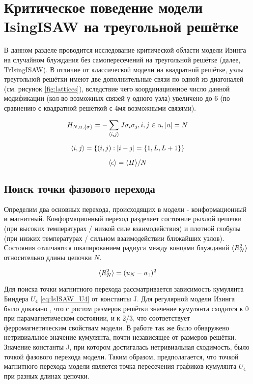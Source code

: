 \section{Критическое поведение модели IsingISAW на треугольной решётке}

В данном разделе проводится исследование критической области модели Изинга на случайном блуждания без самопересечений на треугольной решётке (далее, TrIsingISAW).
В отличие от классической модели на квадратной решётке, узлы треугольной решётки имеют две дополнительные связи по одной из диагоналей (см. рисунок \ref{fig:lattices}), 
вследствие чего координационное число данной модификации (кол-во возможных связей у одного узла) увеличено до 6 (по сравнению с квадратной решёткой с 4мя возможными связями).

\begin{equation}
\label{eq:IsISAW_H}
 H_{N,u,\{\sigma\}} = -\sum_{\langle i,j \rangle} J\sigma_i \sigma_j, i,j \in u, |u| = N
\end{equation}

\begin{equation}
	\langle i,j \rangle = \{(i,j): |i-j| = \{1, L, L+1\} \}
\end{equation}

\begin{equation}
\label{eq:TrIsISAW_E}
\langle \epsilon \rangle = \langle H \rangle / N
\end{equation}

\subsection{Поиск точки фазового перехода}

Определим два основных перехода, происходящих в модели - конформационный и магнитный.
Конформационный переход разделяет состояние рыхлой цепочки (при высоких температурах / низкой силе взаимодействия) и плотной глобулы (при низких температурах / сильном взаимодействии ближайших узлов).
Состояния отличаются шкалированием радиуса между концами блужданий $\langle R^2_N \rangle$ относительно длины цепочки $N$.

\begin{equation}
	\langle R^2_N \rangle = (u_{N} - u_{1})^2
\end{equation}

Для поиска точки магнитного перехода рассматривается зависимость кумулянта Биндера $U_4$ \eqref{eq:IsISAW_U4} от константы J.
Для регулярной модели Изинга было доказано \cite{Binder1981_Ising}, 
что с ростом размеров решётки значение кумулянта сходится к 0 при парамагнетическом состоянии, 
и к 2/3, что соответствует ферромагнетическим свойствам модели.
В работе \cite{Binder1981_Ising} так же было обнаружено нетривиальное значение кумулянта, почти независящее от размеров решётки.
Значение константы J, при котором достигалась нетривиальная сходимость, было точкой фазового перехода модели.
Таким образом, предполагается, что точкой магнитного перехода модели является 
точка пересечения графиков кумулянта $U_4$ при разных длинах цепочки.

